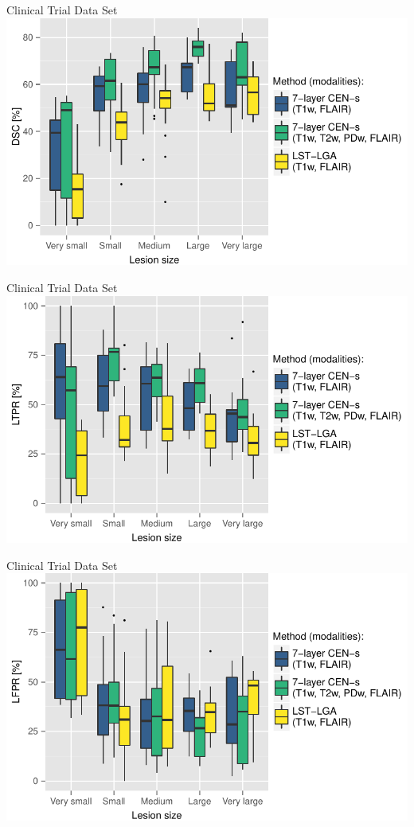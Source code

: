 \documentclass{beamer}
\begin{document}
\begin{frame}{Clinical Trial Data Set}
\includegraphics[width=1.02\textwidth]{images/dsc2}
\end{frame}

\begin{frame}{Clinical Trial Data Set}
\includegraphics[width=1.02\textwidth]{images/tpr}
\end{frame}

\begin{frame}{Clinical Trial Data Set}
\includegraphics[width=1.02\textwidth]{images/fpr}
\end{frame}
\end{document}
